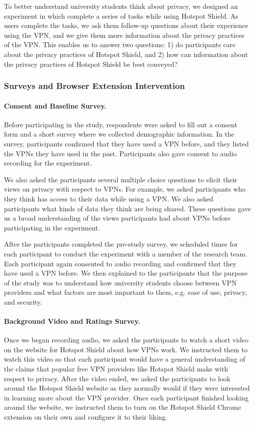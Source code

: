 To better understand university students think about privacy, we designed an experiment in which complete a series of tasks while using Hotspot Shield. As users complete the tasks, we ask them follow-up questions about their experience using the VPN, and we give them more information about the privacy practices of the VPN. This enables us to answer two questions: 1) do participants care about the privacy practices of Hotspot Shield, and 2) how can information about the privacy practices of Hotspot Shield be best conveyed?

\subsubsection{Surveys and Browser Extension Intervention}

\paragraph{Consent and Baseline Survey.}
Before participating in the study, respondents were asked to fill out a
consent form and a short survey where we collected demographic information.
In the survey, participants confirmed that they have used a VPN before, and
they listed the VPNs they have used in the past.  Participants also gave
consent to audio recording for the experiment.

We also asked the participants several multiple choice questions to elicit
their views on privacy with respect to VPNs.  For example, we asked
participants who they think has access to their data while using a VPN.  We
also asked participants what kinds of data they think are being shared.  These
questions gave us a broad understanding of the views participants had about
VPNs before participating in the experiment.

After the participants completed the pre-study survey, we scheduled times for
each participant to conduct the experiment with a member of the research team.
Each participant again consented to audio recording and confirmed that they
have used a VPN before.  We then explained to the participants that the
purpose of the study was to understand how university students choose between
VPN providers and what factors are most important to them, e.g. ease of use,
privacy, and security.

\paragraph{Background Video and Ratings Survey.}
Once we began recording audio, we asked the participants to watch a short
video on the website for Hotspot Shield about how VPNs work.  We instructed
them to watch this video so that each participant would have a general
understanding of the claims that popular free VPN providers like Hotspot
Shield make with respect to privacy.  After the video ended, we asked the
participants to look around the Hotspot Shield website as they normally would
if they were interested in learning more about the VPN provider.  Once each
participant finished looking around the website, we instructed them to turn on
the Hotspot Shield Chrome extension on their own and configure it to their
liking.

